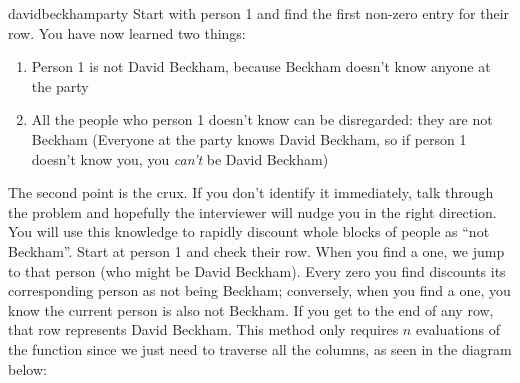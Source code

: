 \begin{answer}{davidbeckhamparty}
Start with person 1 and find the first non-zero entry for their row.
You have now learned two things:
\begin{enumerate}
  \item Person 1 is not David Beckham, because Beckham doesn't know anyone at the party
  \item All the people who person 1 doesn't know can be disregarded: they are not Beckham (Everyone at the party knows David Beckham, so if person 1 doesn't know you, you \emph{can't} be David Beckham)
\end{enumerate}
The second point is the crux.
If you don't identify it immediately, talk through the problem and hopefully the interviewer will nudge you in the right direction.
You will use this knowledge to rapidly discount whole blocks of people as ``not Beckham''.
Start at person 1 and check their row.
When you find a one, we jump to that person (who might be David Beckham).
Every zero you find discounts its corresponding person as not being Beckham; conversely, when you find a one, you know the current person is also not Beckham.
If you get to the end of any row, that row represents David Beckham.
This method only requires $n$ evaluations of the function since we just need to traverse all the columns, as seen in the diagram below:

\begin{center}
\end{center}
\end{answer}
